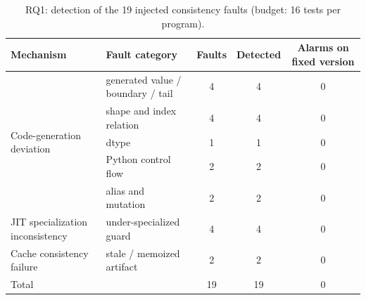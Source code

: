 \begin{table}[t]
\caption{RQ1: detection of the 19 injected consistency faults (budget: 16 tests per program).}
\label{tab:rq1}
\footnotesize
\begin{tabular}{@{}llccc@{}}
\toprule
Mechanism & Fault category & Faults & Detected & Alarms on fixed version \\
\midrule
\multirow{5}{*}{Code-generation deviation}
  & generated value / boundary / tail & 4 & 4 & 0 \\
  & shape and index relation & 4 & 4 & 0 \\
  & dtype & 1 & 1 & 0 \\
  & Python control flow & 2 & 2 & 0 \\
  & alias and mutation & 2 & 2 & 0 \\
JIT specialization inconsistency & under-specialized guard & 4 & 4 & 0 \\
Cache consistency failure & stale / memoized artifact & 2 & 2 & 0 \\
\midrule
Total & & 19 & 19 & 0 \\
\bottomrule
\end{tabular}
\end{table}
